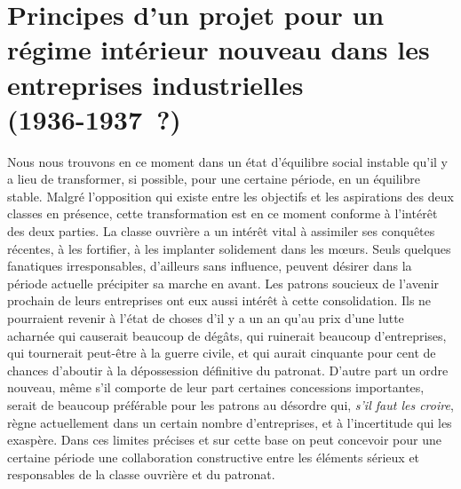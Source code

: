 \documentclass[french,twoside]{book} %
\begin{document}
\section[Principes d'un projet pour un régime intérieur nouveau dans les entreprises industrielles, (1936-1937 ?)]{Principes d'un projet pour un régime intérieur nouveau dans les entreprises industrielles \\
 (1936-1937 ?)}\renewcommand{\leftmark}{Principes d'un projet pour un régime intérieur nouveau dans les entreprises industrielles \\
 (1936-1937 ?)}

\noindent \par
Nous nous trouvons en ce moment dans un état d'équilibre social instable qu'il y a lieu de transformer, si possible, pour une certaine période, en un équilibre stable. Malgré l'opposition qui existe entre les objectifs et les aspirations des deux classes en présence, cette transformation est en ce moment conforme à l'intérêt des deux parties. La classe ouvrière a un intérêt vital à assimiler ses conquêtes récentes, à les fortifier, à les implanter solidement dans les mœurs. Seuls quelques fanatiques irresponsables, d'ailleurs sans influence, peuvent désirer dans la période actuelle précipiter sa marche en avant. Les patrons soucieux de l'avenir prochain de leurs entreprises ont eux aussi intérêt à cette consolidation. Ils ne pourraient revenir à l'état de choses d'il y a un an qu'au prix d'une lutte acharnée qui causerait beaucoup de dégâts, qui ruinerait beaucoup d’entreprises, qui tournerait peut-être à la guerre civile, et qui aurait cinquante pour cent de chances d'aboutir à la dépossession définitive du patronat. D'autre part un ordre nouveau, même s'il comporte de leur part certaines concessions importantes, serait de beaucoup préférable pour les patrons au désordre qui, {\itshape s'il faut les croire}, règne actuellement dans un certain nombre d'entreprises, et à l'incertitude qui les exaspère. Dans ces limites précises et sur cette base on peut concevoir pour une certaine période une collaboration constructive entre les éléments sérieux et responsables de la classe ouvrière et du patronat.\par
\end{document}
